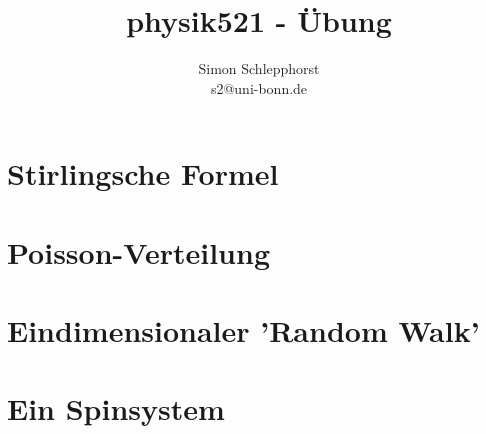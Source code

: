 

\setcounter{thezettel}{1}
\renewcommand\thesection{\arabic{thezettel}.\arabic{section}}

\title{physik521 - Übung }
\author{Simon Schlepphorst\\ \small{s2@uni-bonn.de}}


\maketitle

\section{Stirlingsche Formel}

\section{Poisson-Verteilung}

\section{Eindimensionaler 'Random Walk'}

\section{Ein Spinsystem}



